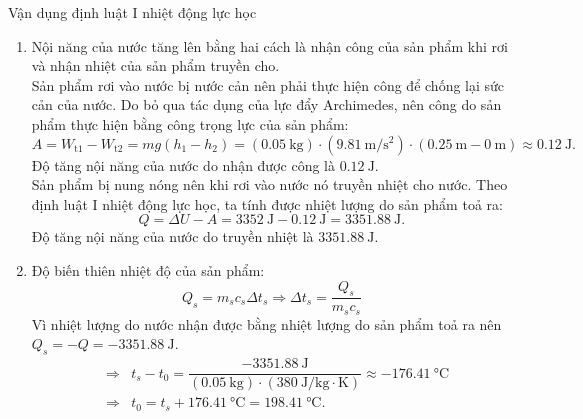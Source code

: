 \begin{dang}{Vận dụng định luật I nhiệt động lực học}
{{\begin{enumerate}[label=\alph*)]
	Do nước muốn tăng nhiệt độ $\Delta t_n=t_2-t_1$ thì phải nhận thêm nhiệt lượng $Q_n=m_nc_n\Delta t_n=\left(\SI{0.4}{\kilogram}\right)\cdot\left[\SI{4190}{\joule/\left(\kilogram\cdot\kelvin\right)}\right]\cdot\left(\SI{22}{\celsius}-\SI{20}{\celsius}\right)=\SI{3352}{\joule}$, nên độ tăng nội năng của nước là:
	$$\Delta U=Q_n=\SI{3352}{\joule}.$$
	\item Nội năng của nước tăng lên bằng hai cách là nhận công của sản phẩm khi rơi và nhận nhiệt của sản phẩm truyền cho.\\
	Sản phẩm rơi vào nước bị nước cản nên phải thực hiện công để chống lại sức cản của nước. Do bỏ qua tác dụng của lực đẩy Archimedes, nên công do sản phẩm thực hiện bằng công trọng lực của sản phẩm:
	$$A=W_\text{t1}-W_\text{t2}=mg\left(h_1-h_2\right)=\left(\SI{0.05}{\kilogram}\right)\cdot\left(\SI{9.81}{\meter/\second^2}\right)\cdot\left(\SI{0.25}{\meter}-\SI{0}{\meter}\right)\approx\SI{0.12}{\joule}.$$
	Độ tăng nội năng của nước do nhận được công là $\SI{0.12}{\joule}$.\\
	Sản phẩm bị nung nóng nên khi rơi vào nước nó truyền nhiệt cho nước. Theo định luật I nhiệt động lực học, ta tính được nhiệt lượng do sản phẩm toả ra:
	$$Q=\Delta U-A=\SI{3352}{\joule}-\SI{0.12}{\joule}=\SI{3351.88}{\joule}.$$
	Độ tăng nội năng của nước do truyền nhiệt là $\SI{3351.88}{\joule}.$
	\item Độ biến thiên nhiệt độ của sản phẩm:
	$$Q_s=m_sc_s\Delta t_s\Rightarrow \Delta t_s=\dfrac{Q_s}{m_sc_s}$$
	Vì nhiệt lượng do nước nhận được bằng nhiệt lượng do sản phẩm toả ra nên $Q_s=-Q=-\SI{3351.88}{\joule}.$
	\begin{eqnarray*}
	&	\Rightarrow& t_s-t_0=\dfrac{-\SI{3351.88}{\joule}}{\left(\SI{0.05}{\kilogram}\right)\cdot\left(\SI{380}{\joule/\kilogram\cdot\kelvin}\right)}\approx-\SI{176.41}{\celsius}
\\
&\Rightarrow& t_0=t_s+\SI{176.41}{\celsius}=\SI{198.41}{\celsius}.
	\end{eqnarray*}
\end{enumerate}}

}
	
\end{dang}
